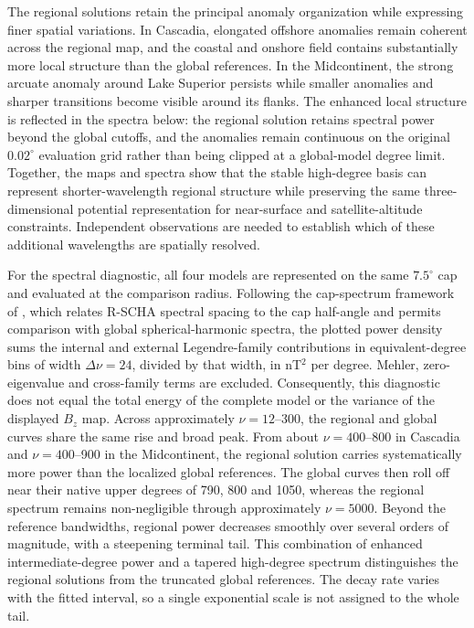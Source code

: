 ﻿\documentclass[11pt,a4paper]{article}
\begin{document}
The regional solutions retain the principal anomaly organization while expressing finer spatial variations. In Cascadia, elongated offshore anomalies remain coherent across the regional map, and the coastal and onshore field contains substantially more local structure than the global references. In the Midcontinent, the strong arcuate anomaly around Lake Superior persists while smaller anomalies and sharper transitions become visible around its flanks. The enhanced local structure is reflected in the spectra below: the regional solution retains spectral power beyond the global cutoffs, and the anomalies remain continuous on the original $0.02^\circ$ evaluation grid rather than being clipped at a global-model degree limit. Together, the maps and spectra show that the stable high-degree basis can represent shorter-wavelength regional structure while preserving the same three-dimensional potential representation for near-surface and satellite-altitude constraints. Independent observations are needed to establish which of these additional wavelengths are spatially resolved.

For the spectral diagnostic, all four models are represented on the same $7.5^\circ$ cap and evaluated at the comparison radius. Following the cap-spectrum framework of \citet{VervelidouThebault2015}, which relates R-SCHA spectral spacing to the cap half-angle and permits comparison with global spherical-harmonic spectra, the plotted power density sums the internal and external Legendre-family contributions in equivalent-degree bins of width $\Delta\nu=24$, divided by that width, in nT$^2$ per degree. Mehler, zero-eigenvalue and cross-family terms are excluded. Consequently, this diagnostic does not equal the total energy of the complete model or the variance of the displayed $B_z$ map. Across approximately $\nu=12$--300, the regional and global curves share the same rise and broad peak. From about $\nu=400$--800 in Cascadia and $\nu=400$--900 in the Midcontinent, the regional solution carries systematically more power than the localized global references. The global curves then roll off near their native upper degrees of 790, 800 and 1050, whereas the regional spectrum remains non-negligible through approximately $\nu=5000$. Beyond the reference bandwidths, regional power decreases smoothly over several orders of magnitude, with a steepening terminal tail. This combination of enhanced intermediate-degree power and a tapered high-degree spectrum distinguishes the regional solutions from the truncated global references. The decay rate varies with the fitted interval, so a single exponential scale is not assigned to the whole tail.
\end{document}

